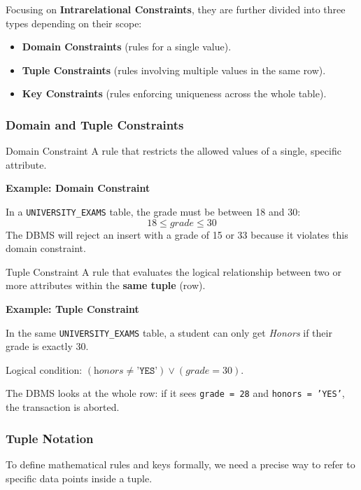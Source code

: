 Focusing on \textbf{Intrarelational Constraints}, they are further divided into three types depending on their scope:
\begin{itemize}
    \item \textbf{Domain Constraints} (rules for a single value).
    \item \textbf{Tuple Constraints} (rules involving multiple values in the same row).
    \item \textbf{Key Constraints} (rules enforcing uniqueness across the whole table).
\end{itemize}

\subsubsection{Domain and Tuple Constraints}

\begin{defbox}{Domain Constraint}
A rule that restricts the allowed values of a single, specific attribute.
\end{defbox}

\vspace{0.2cm}
\begin{example}{\textbf{Example: Domain Constraint}}

In a \texttt{UNIVERSITY\_EXAMS} table, the grade must be between 18 and 30: 
$$18 \leq grade \leq 30$$
The DBMS will reject an insert with a grade of 15 or 33 because it violates this domain constraint.
\end{example}

\begin{defbox}{Tuple Constraint}
A rule that evaluates the logical relationship between two or more attributes within the \textbf{same tuple} (row).
\end{defbox}

\vspace{0.2cm}
\begin{example}{\textbf{Example: Tuple Constraint}}

In the same \texttt{UNIVERSITY\_EXAMS} table, a student can only get \textit{Honors} if their grade is exactly 30. 

Logical condition: $(\textit{honors} \neq \texttt{'YES'}) \lor (\textit{grade} = 30)$.

The DBMS looks at the whole row: if it sees \texttt{grade = 28} and \texttt{honors = 'YES'}, the transaction is aborted.
\end{example}

\subsubsection{Tuple Notation}
To define mathematical rules and keys formally, we need a precise way to refer to specific data points inside a tuple.

